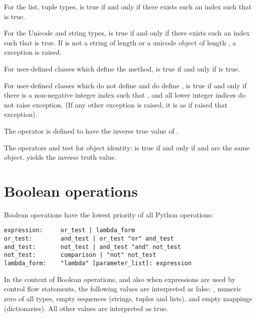 For the list, tuple types,  is true if and only
if there exists such an index  such that
 is true.

For the Unicode and string types,  is true if and only
if there exists such an index  such that
 is true. If  is not
a string of length  or a unicode object of length ,
a  exception is raised.

For user-defined classes which define the  method,
 is true if and only if
 is true.

For user-defined classes which do not define  and
do define ,  is true if and only
if there is a non-negative integer index  such that
, and all lower integer indices
do not raise  exception. (If any other exception
is raised, it is as if  raised that exception).

The operator  is defined to have the inverse true value
of .

The operators  and  test for object identity:
 is true if and only if  and 
are the same object.   yields the inverse
truth value.

\section{Boolean operations\label{Booleans}}

Boolean operations have the lowest priority of all Python operations:

\begin{verbatim}
expression:     or_test | lambda_form
or_test:        and_test | or_test "or" and_test
and_test:       not_test | and_test "and" not_test
not_test:       comparison | "not" not_test
lambda_form:	"lambda" [parameter_list]: expression
\end{verbatim}

In the context of Boolean operations, and also when expressions are
used by control flow statements, the following values are interpreted
as false: , numeric zero of all types, empty sequences
(strings, tuples and lists), and empty mappings (dictionaries).  All
other values are interpreted as true.

